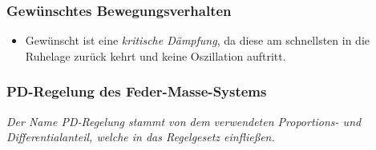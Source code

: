 			\subsubsection{Gewünschtes Bewegungsverhalten} %
				\begin{itemize}
					\item Gewünscht ist eine \textit{kritische Dämpfung}, da diese am schnellsten in die Ruhelage zurück kehrt und keine Oszillation auftritt.
				\end{itemize}

			\subsubsection{PD-Regelung des Feder-Masse-Systems} %
				\textit{Der Name PD-Regelung stammt von dem verwendeten Proportions- und Differentialanteil, welche in das Regelgesetz einfließen.}

